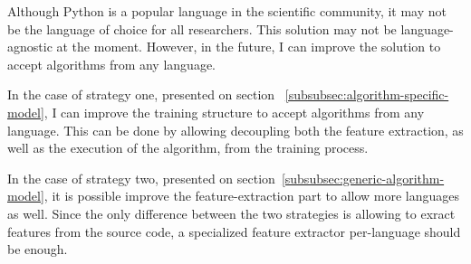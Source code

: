 Although Python is a popular language in the scientific community, it may not be the language of choice for all researchers.
This solution may not be language-agnostic at the moment.
However, in the future, I can improve the solution to accept algorithms from any language.

In the case of strategy one, presented on section ~\ref{subsubsec:algorithm-specific-model}, I can improve the training structure to accept algorithms from any language.
This can be done by allowing decoupling both the feature extraction, as well as the execution of the algorithm, from the training process.

In the case of strategy two, presented on section~\ref{subsubsec:generic-algorithm-model}, it is possible improve the feature-extraction part to allow more languages as well.
Since the only difference between the two strategies is allowing to exract features from the source code, a specialized feature extractor per-language should be enough.


